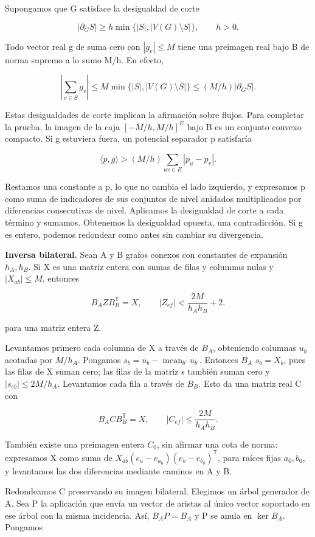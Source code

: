 \documentclass[spanish,11pt,a4paper]{article}
\begin{document}
Supongamos que G satisface la desigualdad de corte

\[|\partial_G S|\ge h\min\{|S|,|V(G)\setminus S|\},\qquad h>0.\tag{F.1}\]

Todo vector real g de suma cero con \(|g_{v}|\le M\) tiene una preimagen real bajo B de norma supremo a lo sumo M/h. En efecto,

\[\left|\sum_{v\in S}g_v\right|\le M\min\{|S|,|V(G)\setminus S|\}\le(M/h)|\partial_G S|.\]

Estas desigualdades de corte implican la afirmación sobre flujos. Para completar la prueba, la imagen de la caja \([-M/h,M/h]^E\) bajo B es un conjunto convexo compacto. Si g estuviera fuera, un potencial separador p satisfaría

\[\langle p,g\rangle>(M/h)\sum_{uv\in E}|p_u-p_v|.\]

Restamos una constante a p, lo que no cambia el lado izquierdo, y expresamos p como suma de indicadores de sus conjuntos de nivel anidados multiplicados por diferencias consecutivas de nivel. Aplicamos la desigualdad de corte a cada término y sumamos. Obtenemos la desigualdad opuesta, una contradicción. Si g es entero, podemos redondear como antes sin cambiar su divergencia.

\textbf{Inversa bilateral.} Sean A y B grafos conexos con constantes de expansión \(h_{A},h_{B}\). Si X es una matriz entera con sumas de filas y columnas nulas y \(|X_{ab}|\le M\), entonces

\[B_A Z B_B^{\mathsf T}=X,\qquad |Z_{ef}|<\frac{2M}{h_Ah_B}+2.\tag{F.2}\]

para una matriz entera Z.

Levantamos primero cada columna de X a través de \(B_{A}\), obteniendo columnas \(u_{b}\) acotadas por \(M/h_{A}\). Pongamos \(s_b=u_b-\operatorname{mean}_{b\prime}u_{b\prime}\). Entonces \(B_{A}\) \(s_{b}=X_{b}\), pues las filas de X suman cero; las filas de la matriz s también suman cero y \(|s_{eb}|\le 2M/h_{A}\). Levantamos cada fila a través de \(B_{B}\). Esto da una matriz real C con

\[B_A C B_B^{\mathsf T}=X,\qquad |C_{ef}|\le\frac{2M}{h_Ah_B}.\tag{F.3}\]

También existe una preimagen entera \(C_{0}\), sin afirmar una cota de norma: expresamos X como suma de \(X_{ab}(e_a-e_{a_0})(e_b-e_{b_0})^{\mathsf T}\), para raíces fijas \(a_0,b_0\), y levantamos las dos diferencias mediante caminos en A y B.

Redondeamos C preservando su imagen bilateral. Elegimos un árbol generador de A. Sea P la aplicación que envía un vector de aristas al único vector soportado en ese árbol con la misma incidencia. Así, \(B_AP=B_A\) y P se anula en \(\ker B_A\). Pongamos
\end{document}
